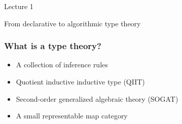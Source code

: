 \documentclass[11pt,aspectratio=169]{beamer}
\begin{document}
\begin{frame}
  \begin{center}
    \Huge Lecture 1

    \bigskip

    \Large
    From declarative to algorithmic type theory
  \end{center}
\end{frame}


\begin{frame}
  \frametitle{What is a type theory?}

  \begin{itemize}
  \item A collection of inference rules
  \item Quotient inductive inductive type (QIIT)
  \item Second-order generalized algebraic theory (SOGAT)
  \item A small representable map category
  \end{itemize}

\end{frame}
\end{document}
